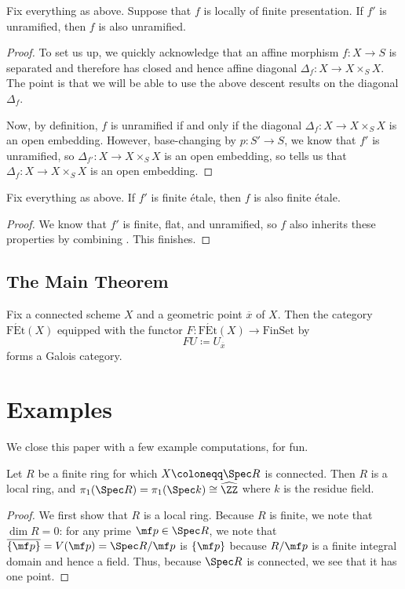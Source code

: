 \documentclass{amsart}
\begin{document}
\begin{lemma} \label{lem:unramified-descent}
    Fix everything as above. Suppose that $f$ is locally of finite presentation. If $f'$ is unramified, then $f$ is also unramified.
\end{lemma}
\begin{proof}
    To set us up, we quickly acknowledge that an affine morphism $f\colon X\to S$ is separated and therefore has closed and hence affine diagonal $\Delta_f\colon X\to X\times_SX$. The point is that we will be able to use the above descent results on the diagonal $\Delta_f$.

    Now, by definition, $f$ is unramified if and only if the diagonal $\Delta_f\colon X\to X\times_SX$ is an open embedding. However, base-changing by $p\colon S'\to S$, we know that $f'$ is unramified, so $\Delta_{f'}\colon X\to X\times_SX$ is an open embedding, so  tells us that $\Delta_f\colon X\to X\times_SX$ is an open embedding.
\end{proof}
\begin{proposition}
    Fix everything as above. If $f'$ is finite \'etale, then $f$ is also finite \'etale.
\end{proposition}
\begin{proof}
    We know that $f'$ is finite, flat, and unramified, so $f$ also inherits these properties by combining . This finishes.
\end{proof}

\subsection{The Main Theorem}
\begin{theorem} \label{thm:etale-cover-galois}
    Fix a connected scheme $X$ and a geometric point $\overline x$ of $X$. Then the category $\mathrm{F\acute Et}(X)$ equipped with the functor $F\colon\mathrm{F\acute Et}(X)\to\mathrm{FinSet}$ by
    \[FU\coloneqq U_{\overline x}\]
    forms a Galois category.
\end{theorem}

\section{Examples}
We close this paper with a few example computations, for fun.
\begin{proposition}
    Let $R$ be a finite ring for which $X\coloneqq\Spec R$ is connected. Then $R$ is a local ring, and $\pi_1(\Spec R)=\pi_1(\Spec k)\cong\widehat\ZZ$ where $k$ is the residue field.
\end{proposition}
\begin{proof}
    We first show that $R$ is a local ring. Because $R$ is finite, we note that $\dim R=0$: for any prime $\mf p\in\Spec R$, we note that $\overline{\{\mf p\}}=V(\mf p)=\Spec R/\mf p$ is $\{\mf p\}$ because $R/\mf p$ is a finite integral domain and hence a field. Thus, because $\Spec R$ is connected, we see that it has one point.
\end{proof}
\end{document}
